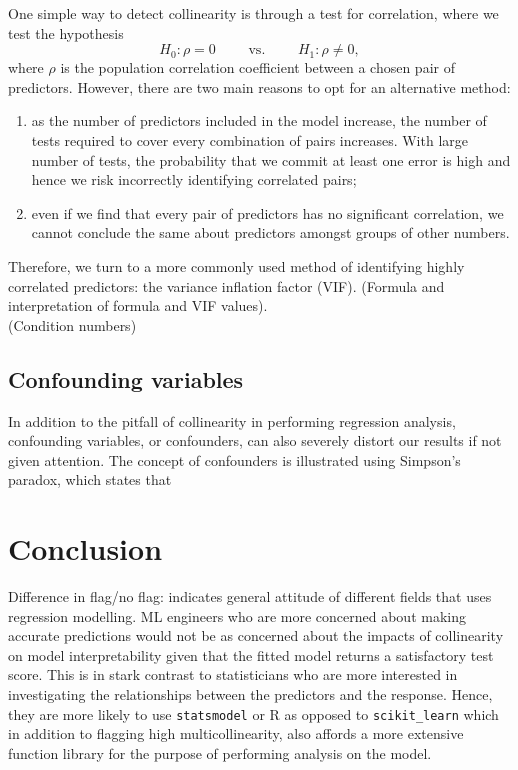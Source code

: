 \documentclass[12pt]{article}
\begin{document}
	One simple way to detect collinearity is through a test for correlation, where we test the hypothesis
	$$H_0: \rho=0 \quad\quad\text{ vs. }\quad\quad H_1: \rho\neq 0,$$
	where $\rho$ is the population correlation coefficient between a chosen pair of predictors. However, there are two main reasons to opt for an alternative method: 
	\begin{enumerate}
		\item as the number of predictors included in the model increase, the number of tests required to cover every combination of pairs increases. With large number of tests, the probability that we commit at least one error is high and hence we risk incorrectly identifying correlated pairs;
		\item even if we find that every pair of predictors has no significant correlation, we cannot conclude the same about predictors amongst groups of other numbers. 
	\end{enumerate}
	
	Therefore, we turn to a more commonly used method of identifying highly correlated predictors: the variance inflation factor (VIF). (Formula and interpretation of formula and VIF values).\\
	
	(Condition numbers)
	
	\subsection{Confounding variables}
	
	In addition to the pitfall of collinearity in performing regression analysis, confounding variables, or confounders, can also severely distort our results if not given attention. The concept of confounders is illustrated using Simpson's paradox, which states that 
	
	\section{Conclusion}
	
	Difference in flag/no flag: indicates general attitude of different fields that uses regression modelling. ML engineers who are more concerned about making accurate predictions would not be as concerned about the impacts of collinearity on model interpretability given that the fitted model returns a satisfactory test score. This is in stark contrast to statisticians who are more interested in investigating the relationships between the predictors and the response. Hence, they are more likely to use \texttt{statsmodel} or R as opposed to \texttt{scikit\_learn} which in addition to flagging high multicollinearity, also affords a more extensive function library for the purpose of performing analysis on the model.
	
\end{document}
